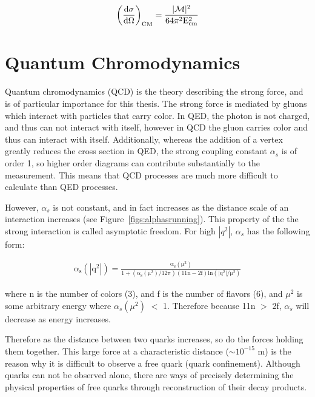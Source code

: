 \begin{eqnarray}
\left(\frac{\mathrm{d\sigma}}{\mathrm{d\Omega}}\right)_{\mathrm{CM}} = \mathrm{\frac{|\cal{M}|^{\mathrm{2}}}{64 \pi^{2} E_{cm}^{2}}}
\label{eqn:xsecfromsigma}
\end{eqnarray}  


\section{Quantum Chromodynamics}
\label{sec:qcdtheory}
Quantum chromodynamics (QCD) is the theory describing the strong force, and is of particular importance for this thesis.  
The strong force is mediated by gluons which interact with particles that carry color.  
In QED, the photon is not charged, and thus can not interact with itself, however in QCD the gluon carries color and thus can interact with itself.  
Additionally, whereas the addition of a vertex greatly reduces the cross section in QED, the strong coupling constant $\alpha_s$ is of order 1, so 
higher order diagrams can contribute substantially to the measurement.  This means that QCD processes are much more difficult to calculate than QED 
processes.

However, $\alpha_s$ is not constant, and in fact increases as the distance scale of an interaction increases (see Figure~\ref{figs:alphasrunning}).  
This property of the the strong interaction is called asymptotic freedom.  For high $|q^2|$, $\alpha_s$ has the following form:

\begin{eqnarray}
\mathrm{\alpha_{s}(|q^2|)} =  \frac{\mathrm{\alpha_{s}(\mu^{2})}}{\mathrm{1+(\alpha_{s}(\mu^{2})/12\pi)(11n-2f)ln(|q^2|/\mu^{2})}}
\label{eqn:qcdalphas}
\end{eqnarray}  

where n is the number of colors (3), and f is the number of flavors (6), and $\mu^{2}$ is some arbitrary energy where $\alpha_{s}(\mu^{2})$ $<$ 1.
Therefore because 11n $>$ 2f, $\alpha_{s}$ will decrease as energy increases.


Therefore as the distance between two quarks increases, so do the forces holding them together.  
This large force at a characteristic distance ($\sim10^{-15}$ m) is the reason why it is difficult to observe a free quark (quark confinement).  
Although quarks can not be observed alone, there are ways of precisely determining the physical properties of free quarks through reconstruction of their decay products.  




